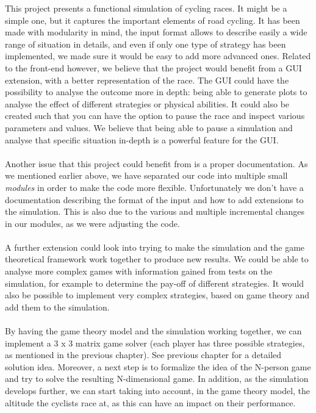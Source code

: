 \documentclass[10pt, a4paper]{report}
\begin{document}



This project presents a functional simulation of cycling races. It might be a simple one, but it captures the important elements of road cycling. It has been made with modularity in mind, the input format allows to describe easily a wide range of situation in details, and even if only one type of strategy has been implemented, we made sure it would be easy to add more advanced ones. Related to the front-end however, we believe that the project would benefit from a GUI extension, with a better representation of the race. The GUI could have the possibility to analyse the outcome more in depth: being able to generate plots to analyse the effect of different strategies or physical abilities. It could also be created such that you can have the option to pause the race and inspect various parameters and values. We believe that being able to pause a simulation and analyse that specific situation in-depth is a powerful feature for the GUI.
\\\\
Another issue that this project could benefit from is a proper documentation. As we mentioned earlier above, we have separated our code into multiple small \textit{modules} in order to make the code more flexible. Unfortunately we don't have a documentation describing the format of the input and how to add extensions to the simulation. This is also due to the various and multiple incremental changes in our modules, as we were adjusting the code.\\\\
A further extension could look into trying to make the simulation and the game theoretical framework work together to produce new results. We could be able to analyse more complex games with information gained from tests on the simulation, for example to determine the pay-off of different strategies. It would also be possible to implement very complex strategies, based on game theory and add them to the simulation. \\\\
By having the game theory model and the simulation working together, we can implement a 3 x 3 matrix game solver (each player has three possible strategies, as mentioned in the previous chapter). See previous chapter for a detailed solution idea. Moreover, a next step is to formalize the idea of the N-person game and try to solve the resulting N-dimensional game. In addition, as the simulation develops further, we can start taking into account, in the game theory model, the altitude the cyclists race at, as this can have an impact on their performance.
\end{document}
